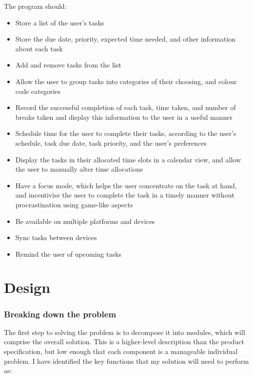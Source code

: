 \documentclass[]{article}
\begin{document}
The program should:

\begin{itemize}
\item
  Store a list of the user's tasks
\item
  Store the due date, priority, expected time needed, and other
  information about each task
\item
  Add and remove tasks from the list
\item
  Allow the user to group tasks into categories of their choosing, and
  colour code categories
\item
  Record the successful completion of each task, time taken, and number
  of breaks taken and display this information to the user in a useful
  manner
\item
  Schedule time for the user to complete their tasks, according to the
  user's schedule, task due date, task priority, and the user's
  preferences
\item
  Display the tasks in their allocated time slots in a calendar view,
  and allow the user to manually alter time allocations
\item
  Have a focus mode, which helps the user concentrate on the task at
  hand, and incentivise the user to complete the task in a timely manner
  without procrastination using game-like aspects
\item
  Be available on multiple platforms and devices
\item
  Sync tasks between devices
\item
  Remind the user of upcoming tasks
\end{itemize}

\hypertarget{design}{%
\section{Design}\label{design}}

\hypertarget{breaking-down-the-problem}{%
\subsubsection{Breaking down the
problem}\label{breaking-down-the-problem}}

The first step to solving the problem is to decompose it into modules,
which will comprise the overall solution. This is a higher-level
description than the product specification, but low enough that each
component is a manageable individual problem. I have identified the key
functions that my solution will need to perform as:
\end{document}
